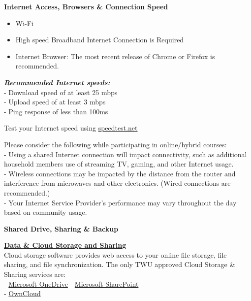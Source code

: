 \documentclass[
]{book}
\providecommand{\tightlist}{%
  \setlength{\itemsep}{0pt}\setlength{\parskip}{0pt}}
\theoremstyle{definition}
\theoremstyle{definition}
\theoremstyle{definition}
\theoremstyle{definition}
\theoremstyle{remark}
\begin{document}
\textbf{Internet Access, Browsers \& Connection Speed}

\begin{itemize}
\tightlist
\item
  Wi-Fi\\
\item
  High speed Broadband Internet Connection is Required\\
\item
  Internet Browser: The most recent release of Chrome or Firefox is recommended.
\end{itemize}

\textbf{\emph{Recommended Internet speeds:}}\\
- Download speed of at least 25 mbps\\
- Upload speed of at least 3 mbps\\
- Ping response of less than 100ms

\begin{feedback}
Test your Internet speed using \url{speedtest.net}
\end{feedback}

Please consider the following while participating in online/hybrid courses:\\
- Using a shared Internet connection will impact connectivity, such as additional household members use of streaming TV, gaming, and other Internet usage.\\
- Wireless connections may be impacted by the distance from the router and interference from microwaves and other electronics. (Wired connections are recommended.)\\
- Your Internet Service Provider's performance may vary throughout the day based on community usage.

\textbf{Shared Drive, Sharing \& Backup}

\textbf{\href{https://trinitywestern.teamdynamix.com/TDClient/1904/Portal/KB/ArticleDet?ID=128533}{Data \& Cloud Storage and Sharing}}\\
Cloud storage software provides web access to your online file storage, file sharing, and file synchronization. The only TWU approved Cloud Storage \& Sharing services are:\\
- \href{https://trinitywestern.teamdynamix.com/TDClient/1904/Portal/KB/ArticleDet?ID=71260}{Microsoft OneDrive}
- \href{https://mytwu.sharepoint.com/}{Microsoft SharePoint}\\
- \href{https://trinitywestern.teamdynamix.com/TDClient/1904/Portal/KB/ArticleDet?ID=15681}{OwnCloud}
\end{document}
